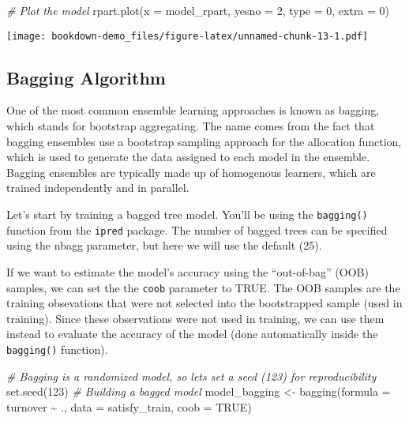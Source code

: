 \documentclass[
]{book}
\newenvironment{Shaded}{\begin{snugshade}}{\end{snugshade}}
\newcommand{\AttributeTok}[1]{\textcolor[rgb]{0.77,0.63,0.00}{#1}}
\newcommand{\CommentTok}[1]{\textcolor[rgb]{0.56,0.35,0.01}{\textit{#1}}}
\newcommand{\ConstantTok}[1]{\textcolor[rgb]{0.00,0.00,0.00}{#1}}
\newcommand{\DecValTok}[1]{\textcolor[rgb]{0.00,0.00,0.81}{#1}}
\newcommand{\FunctionTok}[1]{\textcolor[rgb]{0.00,0.00,0.00}{#1}}
\newcommand{\NormalTok}[1]{#1}
\newcommand{\OtherTok}[1]{\textcolor[rgb]{0.56,0.35,0.01}{#1}}
\newcommand{\SpecialCharTok}[1]{\textcolor[rgb]{0.00,0.00,0.00}{#1}}
\begin{document}
\begin{Shaded}
\begin{Highlighting}[]
\CommentTok{\# Plot the model}
\FunctionTok{rpart.plot}\NormalTok{(}\AttributeTok{x =}\NormalTok{ model\_rpart, }\AttributeTok{yesno =} \DecValTok{2}\NormalTok{, }\AttributeTok{type =} \DecValTok{0}\NormalTok{, }\AttributeTok{extra =} \DecValTok{0}\NormalTok{)}
\end{Highlighting}
\end{Shaded}

\texttt{[image: bookdown-demo\_files/figure-latex/unnamed-chunk-13-1.pdf]}

\hypertarget{bagging-algorithm-1}{%
\subsection{Bagging Algorithm}\label{bagging-algorithm-1}}

One of the most common ensemble learning approaches is known as bagging, which
stands for bootstrap aggregating. The name comes from the fact that bagging ensembles use a bootstrap sampling approach for the allocation function, which is used to generate the data assigned to each model in the ensemble. Bagging ensembles are typically made up of homogenous learners, which are trained independently and in parallel.

Let's start by training a bagged tree model. You'll be using the \texttt{bagging()} function from the \texttt{ipred} package. The number of bagged trees can be specified using the nbagg parameter, but here we will use the default (25).

If we want to estimate the model's accuracy using the ``out-of-bag'' (OOB) samples, we can set the the \texttt{coob} parameter to TRUE. The OOB samples are the training obsevations that were not selected into the bootstrapped sample (used in training). Since these observations were not used in training, we can use them instead to evaluate the accuracy of the model (done automatically inside the \texttt{bagging()} function).

\begin{Shaded}
\begin{Highlighting}[]
\CommentTok{\# Bagging is a randomized model, so let\textquotesingle{}s set a seed (123) for reproducibility}
\FunctionTok{set.seed}\NormalTok{(}\DecValTok{123}\NormalTok{)}
\CommentTok{\# Building a bagged model}
\NormalTok{model\_bagging }\OtherTok{\textless{}{-}} \FunctionTok{bagging}\NormalTok{(}\AttributeTok{formula =}\NormalTok{ turnover }\SpecialCharTok{\textasciitilde{}}\NormalTok{ ., }
                         \AttributeTok{data =}\NormalTok{ satisfy\_train,}
                         \AttributeTok{coob =} \ConstantTok{TRUE}\NormalTok{)}
\end{Highlighting}
\end{Shaded}
\end{document}
